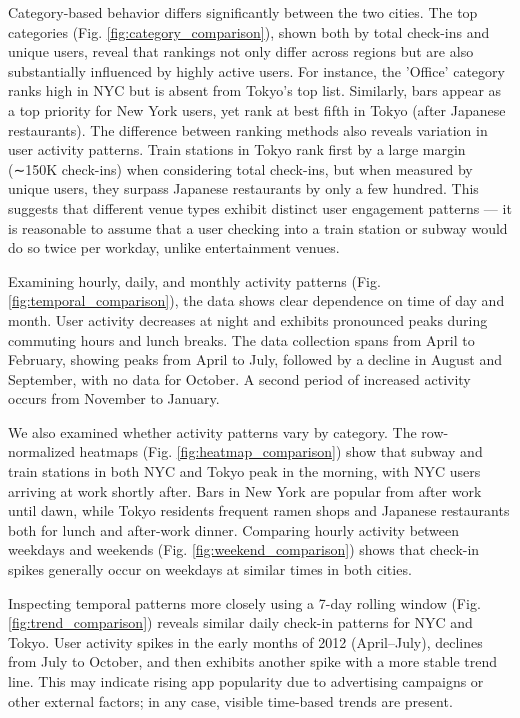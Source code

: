 \documentclass[12pt, journal]{IEEEtran}
\begin{document}
Category-based behavior differs significantly between the two cities. The top categories (Fig. \ref{fig:category_comparison}), shown both by total check-ins and unique users, reveal that rankings not only differ across regions but are also substantially influenced by highly active users. For instance, the 'Office' category ranks high in NYC but is absent from Tokyo's top list. Similarly, bars appear as a top priority for New York users, yet rank at best fifth in Tokyo (after Japanese restaurants). The difference between ranking methods also reveals variation in user activity patterns. Train stations in Tokyo rank first by a large margin (∼150K check-ins) when considering total check-ins, but when measured by unique users, they surpass Japanese restaurants by only a few hundred. This suggests that different venue types exhibit distinct user engagement patterns — it is reasonable to assume that a user checking into a train station or subway would do so twice per workday, unlike entertainment venues.

Examining hourly, daily, and monthly activity patterns (Fig. \ref{fig:temporal_comparison}), the data shows clear dependence on time of day and month. User activity decreases at night and exhibits pronounced peaks during commuting hours and lunch breaks. The data collection spans from April to February, showing peaks from April to July, followed by a decline in August and September, with no data for October. A second period of increased activity occurs from November to January.

We also examined whether activity patterns vary by category. The row-normalized heatmaps (Fig. \ref{fig:heatmap_comparison}) show that subway and train stations in both NYC and Tokyo peak in the morning, with NYC users arriving at work shortly after. Bars in New York are popular from after work until dawn, while Tokyo residents frequent ramen shops and Japanese restaurants both for lunch and after-work dinner. Comparing hourly activity between weekdays and weekends (Fig. \ref{fig:weekend_comparison}) shows that check-in spikes generally occur on weekdays at similar times in both cities.

Inspecting temporal patterns more closely using a 7-day rolling window (Fig. \ref{fig:trend_comparison}) reveals similar daily check-in patterns for NYC and Tokyo. User activity spikes in the early months of 2012 (April–July), declines from July to October, and then exhibits another spike with a more stable trend line. This may indicate rising app popularity due to advertising campaigns or other external factors; in any case, visible time-based trends are present.
\end{document}
